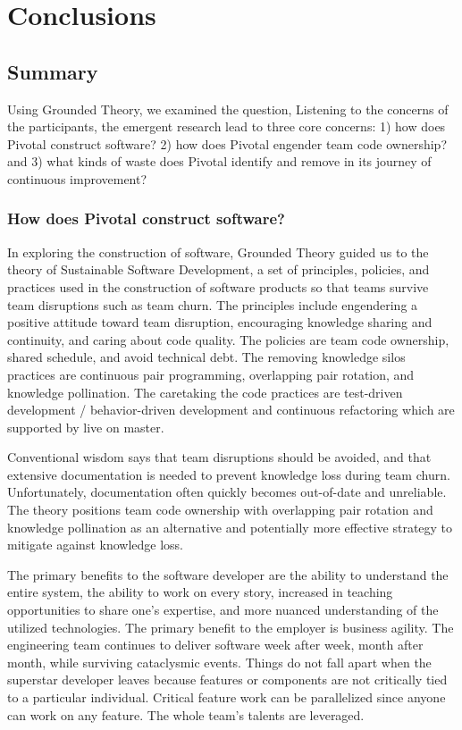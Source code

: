 

\chapter{Conclusions}
\label{ConclusionChapter}
\section{Summary}
Using Grounded Theory, we examined the question,  Listening to the concerns of the participants, the emergent research lead to three core concerns: 1) how does Pivotal construct software? 2) how does Pivotal engender team code ownership? and 3) what kinds of waste does Pivotal identify and remove in its journey of continuous improvement? 


\subsection{How does Pivotal construct software?}
In exploring the construction of software, Grounded Theory guided us to the theory of Sustainable Software Development, a set of principles, policies, and practices used in the construction of software products so that teams survive team disruptions such as team churn. The principles include engendering a positive attitude toward team disruption, encouraging knowledge sharing and continuity, and caring about code quality. The policies are team code ownership, shared schedule, and avoid technical debt. The removing knowledge silos practices are continuous pair programming, overlapping pair rotation, and knowledge pollination. The caretaking the code practices are test-driven development / behavior-driven development and continuous refactoring which are supported by live on master.


Conventional wisdom says that team disruptions should be avoided, and that extensive documentation is needed to prevent knowledge loss during team churn. Unfortunately, documentation often quickly becomes out-of-date and unreliable. The theory positions team code ownership with overlapping pair rotation and knowledge pollination as an alternative and potentially more effective strategy to mitigate against knowledge loss.


The primary benefits to the software developer are the ability to understand the entire system, the ability to work on every story, increased in teaching opportunities to share one's expertise, and more nuanced understanding of the utilized technologies.
The primary benefit to the employer is business agility. The engineering team continues to deliver software week after week, month after month, while surviving cataclysmic events. Things do not fall apart when the superstar developer leaves because features or components are not critically tied to a particular individual. Critical feature work can be parallelized since anyone can work on any feature. The whole team's talents are leveraged.


